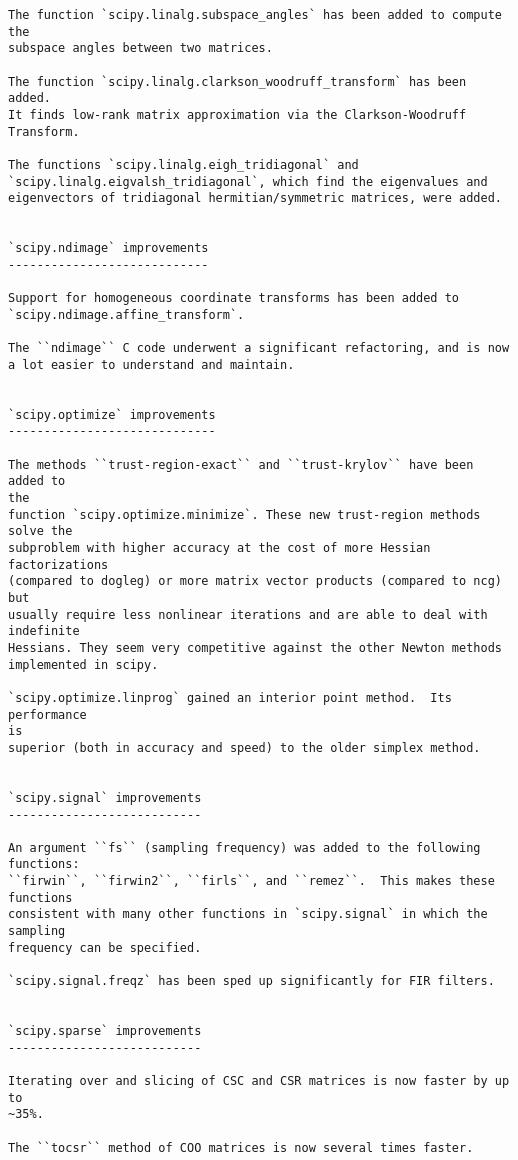 \begin{verbatim}
The function `scipy.linalg.subspace_angles` has been added to compute the
subspace angles between two matrices.

The function `scipy.linalg.clarkson_woodruff_transform` has been added.
It finds low-rank matrix approximation via the Clarkson-Woodruff Transform.

The functions `scipy.linalg.eigh_tridiagonal` and
`scipy.linalg.eigvalsh_tridiagonal`, which find the eigenvalues and
eigenvectors of tridiagonal hermitian/symmetric matrices, were added.


`scipy.ndimage` improvements
----------------------------

Support for homogeneous coordinate transforms has been added to
`scipy.ndimage.affine_transform`.

The ``ndimage`` C code underwent a significant refactoring, and is now
a lot easier to understand and maintain.


`scipy.optimize` improvements
-----------------------------

The methods ``trust-region-exact`` and ``trust-krylov`` have been added to
the
function `scipy.optimize.minimize`. These new trust-region methods solve the
subproblem with higher accuracy at the cost of more Hessian factorizations
(compared to dogleg) or more matrix vector products (compared to ncg) but
usually require less nonlinear iterations and are able to deal with
indefinite
Hessians. They seem very competitive against the other Newton methods
implemented in scipy.

`scipy.optimize.linprog` gained an interior point method.  Its performance
is
superior (both in accuracy and speed) to the older simplex method.


`scipy.signal` improvements
---------------------------

An argument ``fs`` (sampling frequency) was added to the following
functions:
``firwin``, ``firwin2``, ``firls``, and ``remez``.  This makes these
functions
consistent with many other functions in `scipy.signal` in which the sampling
frequency can be specified.

`scipy.signal.freqz` has been sped up significantly for FIR filters.


`scipy.sparse` improvements
---------------------------

Iterating over and slicing of CSC and CSR matrices is now faster by up to
~35%.

The ``tocsr`` method of COO matrices is now several times faster.


\end{verbatim}
